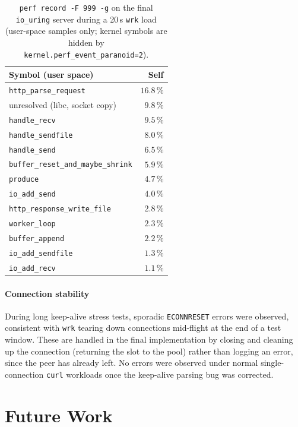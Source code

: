 \documentclass{article}
\begin{document}
\begin{table}[h]
\centering
\begin{tabular}{lr}
\toprule
\textbf{Symbol (user space)} & \textbf{Self} \\
\midrule
\texttt{http\_parse\_request}       & $16.8\,\%$ \\
unresolved (libc, socket copy)      & $9.8\,\%$ \\
\texttt{handle\_recv}               & $9.5\,\%$ \\
\texttt{handle\_sendfile}           & $8.0\,\%$ \\
\texttt{handle\_send}               & $6.5\,\%$ \\
\texttt{buffer\_reset\_and\_maybe\_shrink} & $5.9\,\%$ \\
\texttt{produce}                    & $4.7\,\%$ \\
\texttt{io\_add\_send}              & $4.0\,\%$ \\
\texttt{http\_response\_write\_file}& $2.8\,\%$ \\
\texttt{worker\_loop}               & $2.3\,\%$ \\
\texttt{buffer\_append}             & $2.2\,\%$ \\
\texttt{io\_add\_sendfile}          & $1.3\,\%$ \\
\texttt{io\_add\_recv}              & $1.1\,\%$ \\
\bottomrule
\end{tabular}
\caption{\texttt{perf record -F 999 -g} on the final \texttt{io\_uring} server during a
20\,s \texttt{wrk} load (user-space samples only; kernel symbols are hidden by
\texttt{kernel.perf\_event\_paranoid=2}).}
\label{tab:perf}
\end{table}

\paragraph{Connection stability}
During long keep-alive stress tests, sporadic \texttt{ECONNRESET} errors were observed,
consistent with \texttt{wrk} tearing down connections mid-flight at the end of a test window.
These are handled in the final implementation by closing and cleaning up the connection
(returning the slot to the pool) rather than logging an error, since the peer has already
left. No errors were observed under normal single-connection \texttt{curl} workloads once
the keep-alive parsing bug was corrected.

\section{Future Work}
\end{document}
